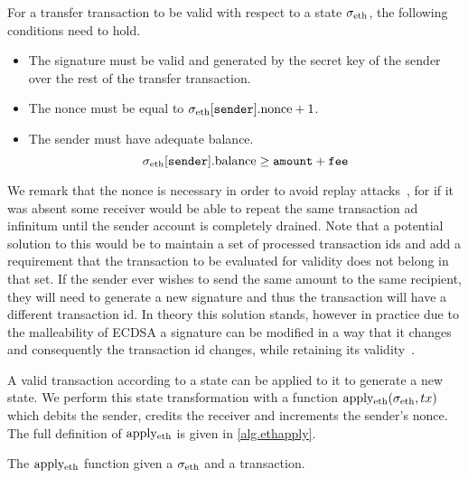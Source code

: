 For a transfer transaction to be valid with respect to a state $\ethstate$, the following conditions need to hold.

\begin{itemize}
    \item The signature must be valid and generated by the secret key of the sender over the rest of the transfer transaction.
    \item The nonce must be equal to $\sigma_\text{eth}[\texttt{sender}].\text{nonce} + 1$.
    \item The sender must have adequate balance.
    \[
        \sigma_\text{eth}[\texttt{sender}].\text{balance} \ge \texttt{amount}+\texttt{fee}
    \]
\end{itemize}

We remark that the nonce is necessary in order to avoid replay attacks~\cite{ethereum-glossary}, for if it was absent some receiver would be able to repeat the same transaction ad infinitum until the sender account is completely drained. Note that a potential solution to this would be to maintain a set of processed transaction ids and add a requirement that the transaction to be evaluated for validity does not belong in that set. If the sender ever wishes to send the same amount to the same recipient, they will need to generate a new signature and thus the transaction will have a different transaction id. In theory this solution stands, however in practice due to the malleability of ECDSA a signature can be modified in a way that it changes and consequently the transaction id changes, while retaining its validity~\cite{malleability}.

\def\ethapply{\text{apply}\textsubscript{eth}}

A valid transaction according to a state can be applied to it to generate a new state. We perform this state transformation with a function $\ethapply(\ethstate, tx)$ which debits the sender, credits the receiver and increments the sender's nonce. The full definition of $\ethapply$ is given in \cref{alg.ethapply}.

\begin{algorithm}[H]
    \caption{\label{alg.ethapply} The $\ethapply$ function given a $\ethstate$ and a transaction.}
    \begin{algorithmic}[1]
        \Function{$\ethapply$}{$\ethstate, tx$}
            \State\Return{$\ethstate$}
        \EndFunction
    \end{algorithmic}
\end{algorithm}

